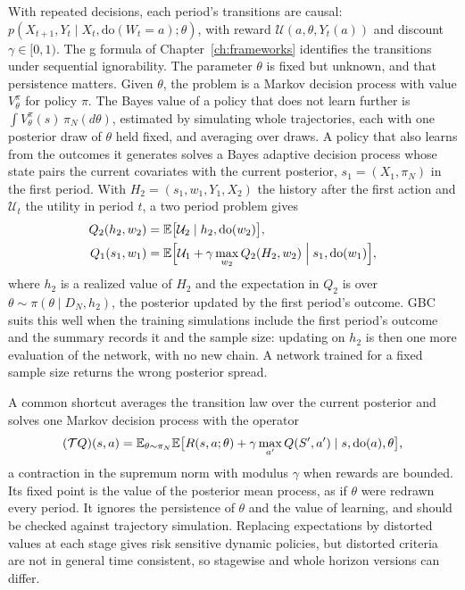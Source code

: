 With repeated decisions, each period's transitions are causal: $p(X_{t+1}, Y_t\mid X_t, \mathrm{do}(W_t=a);\theta)$, with reward $\mathcal{U}(a,\theta,Y_t(a))$ and discount $\gamma\in[0,1)$. The g formula of Chapter~\ref{ch:frameworks} identifies the transitions under sequential ignorability. The parameter $\theta$ is fixed but unknown, and that persistence matters. Given $\theta$, the problem is a Markov decision process with value $V_\theta^\pi$ for policy $\pi$. The Bayes value of a policy that does not learn further is $\int V^\pi_\theta(s)\,\pi_N(d\theta)$, estimated by simulating whole trajectories, each with one posterior draw of $\theta$ held fixed, and averaging over draws. A policy that also learns from the outcomes it generates solves a Bayes adaptive decision process whose state pairs the current covariates with the current posterior, $s_1=(X_1,\pi_N)$ in the first period. With $H_2=(s_1,w_1,Y_1,X_2)$ the history after the first action and $\mathcal{U}_t$ the utility in period $t$, a two period problem gives
\[
\begin{aligned}
Q_2(h_2,w_2) &= \mathbb{E}\bigl[\mathcal{U}_2\mid h_2,\mathrm{do}(w_2)\bigr],\\
Q_1(s_1,w_1) &= \mathbb{E}\Bigl[\mathcal{U}_1 + \gamma\max_{w_2}Q_2(H_2,w_2)\Bigm| s_1,\mathrm{do}(w_1)\Bigr],
\end{aligned}
\]
where $h_2$ is a realized value of $H_2$ and the expectation in $Q_2$ is over $\theta\sim\pi(\theta\mid D_N,h_2)$, the posterior updated by the first period's outcome. GBC suits this well when the training simulations include the first period's outcome and the summary records it and the sample size: updating on $h_2$ is then one more evaluation of the network, with no new chain. A network trained for a fixed sample size returns the wrong posterior spread.

A common shortcut averages the transition law over the current posterior and solves one Markov decision process with the operator
\[
(\mathcal T Q)(s,a) = \mathbb{E}_{\theta\sim\pi_N}\mathbb{E}\bigl[R(s,a;\theta) + \gamma\max_{a'} Q(S',a')\mid s,\mathrm{do}(a),\theta\bigr],
\]
a contraction in the supremum norm with modulus $\gamma$ when rewards are bounded. Its fixed point is the value of the posterior mean process, as if $\theta$ were redrawn every period. It ignores the persistence of $\theta$ and the value of learning, and should be checked against trajectory simulation. Replacing expectations by distorted values at each stage gives risk sensitive dynamic policies, but distorted criteria are not in general time consistent, so stagewise and whole horizon versions can differ.




